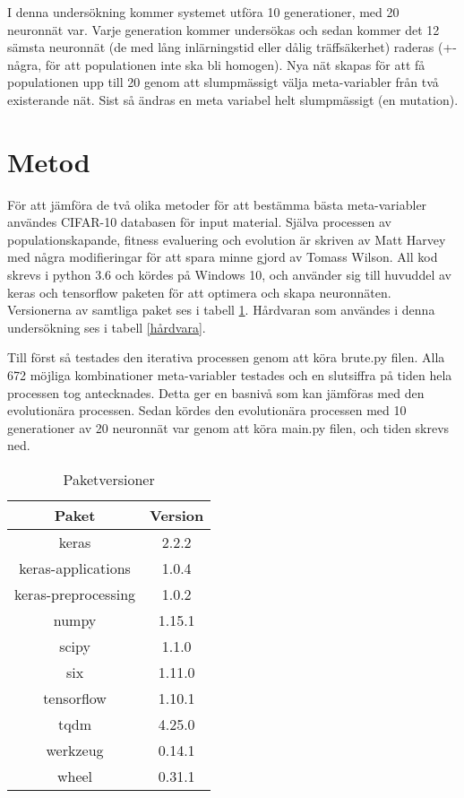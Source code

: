 \documentclass[a4paper, 12pt]{article}
\begin{document}
    I denna undersökning kommer systemet utföra 10 generationer, med 20 neuronnät var. Varje generation kommer undersökas och sedan kommer det 12 sämsta neuronnät (de med lång inlärningstid eller dålig träffsäkerhet) raderas (+- några, för att populationen inte ska bli homogen).  Nya nät skapas för att få populationen upp till 20 genom att slumpmässigt välja meta-variabler från två existerande nät. Sist så ändras en meta variabel helt slumpmässigt (en mutation).

  \section{Metod}
  För att jämföra de två olika metoder för att bestämma bästa meta-variabler användes CIFAR-10 databasen för input material. Själva processen av populationskapande, fitness evaluering och evolution är skriven av Matt Harvey \parencite{harvey2017} med några modifieringar för att spara minne gjord av Tomass Wilson. All kod skrevs i python 3.6 och kördes på Windows 10, och använder sig till huvuddel av keras och tensorflow paketen för att optimera och skapa neuronnäten. Versionerna av samtliga paket ses i tabell \ref{paketversioner}. Hårdvaran som användes i denna undersökning ses i tabell \ref{hårdvara}.

  Till först så testades den iterativa processen genom att köra brute.py filen. Alla 672 möjliga kombinationer meta-variabler testades och en slutsiffra på tiden hela processen tog antecknades. Detta ger en basnivå som kan jämföras med den evolutionära processen. Sedan kördes den evolutionära processen med 10 generationer av 20 neuronnät var genom att köra main.py filen, och tiden skrevs ned.

\begin{table}[htb]
    \centering
    \begin{tabular}{c|c}
      Paket & Version \\
      \hline
      keras & 2.2.2 \\
      keras-applications & 1.0.4 \\
      keras-preprocessing & 1.0.2 \\
      numpy & 1.15.1 \\
      scipy & 1.1.0 \\
      six & 1.11.0 \\
      tensorflow & 1.10.1 \\
      tqdm & 4.25.0 \\
      werkzeug & 0.14.1 \\
      wheel & 0.31.1
    \end{tabular}
    \caption{Paketversioner}
    \label{paketversioner}
\end{table}
\end{document}
